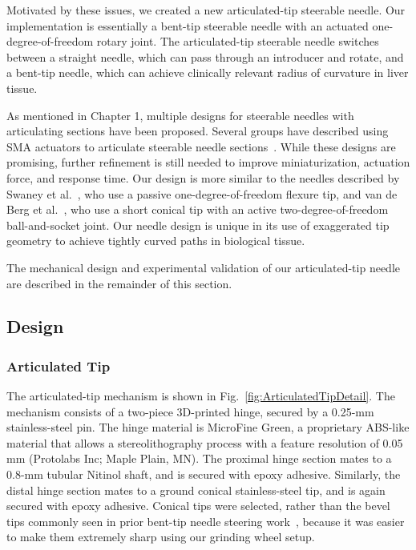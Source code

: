 Motivated by these issues, we created a new articulated-tip steerable needle. Our implementation is essentially a bent-tip steerable needle with an actuated one-degree-of-freedom rotary joint. The articulated-tip steerable needle switches between a straight needle, which can pass through an introducer and rotate, and a bent-tip needle, which can achieve clinically relevant radius of curvature in liver tissue.

As mentioned in Chapter 1, multiple designs for steerable needles with articulating sections have been proposed. Several groups have described using SMA actuators to articulate steerable needle sections~\cite{Ayvali2012,Datla2014,Ryu2014}. While these designs are promising, further refinement is still needed to improve miniaturization, actuation force, and response time. Our design is more similar to the needles described by Swaney et al.~\cite{Swaney2013}, who use a passive one-degree-of-freedom flexure tip, and van de Berg et al.~\cite{vandeBerg2015}, who use a short conical tip with an active two-degree-of-freedom ball-and-socket joint. Our needle design is unique in its use of exaggerated tip geometry to achieve tightly curved paths in biological tissue.

The mechanical design and experimental validation of our articulated-tip needle are described in the remainder of this section.

\subsection{Design}
\subsubsection{Articulated Tip}
The articulated-tip mechanism is shown in Fig.~\ref{fig:ArticulatedTipDetail}. The mechanism consists of a two-piece 3D-printed hinge, secured by a 0.25-mm stainless-steel pin. The hinge material is MicroFine Green, a proprietary ABS-like material that allows a stereolithography process with a feature resolution of 0.05 mm (Protolabs Inc; Maple Plain, MN). The proximal hinge section mates to a 0.8-mm tubular Nitinol shaft, and is secured with epoxy adhesive. Similarly, the distal hinge section mates to a ground conical stainless-steel tip, and is again secured with epoxy adhesive. Conical tips were selected, rather than the bevel tips commonly seen in prior bent-tip needle steering work~\cite{Majewicz2012,Majewicz2010}, because it was easier to make them extremely sharp using our grinding wheel setup. 


